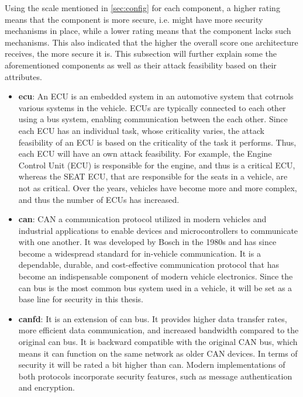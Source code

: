 Using the scale mentioned in \ref{sec:config} for each component, a higher rating means that the component is more secure, i.e. might have more security mechanisms in place,
while a lower rating means that the component lacks such mechanisms.
This also indicated that the higher the overall score one architecture receives, the more secure it is.
This subsection will further explain some the aforementioned components as well as their attack feasibility based on their attributes.

\begin{itemize}
    \item \textbf{\gls{ecu}}: An ECU is an embedded system in an automotive system that cotrnols various systems in the vehicle.
    ECUs are typically connected to each other using a bus system, enabling communication between the each other.
    Since each ECU has an individual task, whose criticality varies, the attack feasibility of an ECU is based on the criticality of the task it performs.
    Thus, each ECU will have an own attack feasibility. 
    For example, the Engine Control Unit (ECU) is responsible for the engine, and thus is a critical ECU, 
    whereas the SEAT ECU, that are responsible for the seats in a vehicle, are not as critical.
    Over the years, vehicles have become more and more complex, and thus the number of ECUs has increased.
    
    \item \textbf{\gls{can}}: CAN a communication protocol utilized in modern vehicles and industrial applications 
    to enable devices and microcontrollers to communicate with one another. 
    It was developed by Bosch in the 1980s and has since become a widespread standard for in-vehicle communication.
    It is a dependable, durable, and cost-effective communication protocol that has become an indispensable component of modern vehicle electronics.
    Since the \gls{can} bus is the most common bus system used in a vehicle, it will be set as a base line for security in this thesis.

    \item \textbf{\gls{canfd}}: It is an extension of \gls{can} bus.
    It provides higher data transfer rates, more efficient data communication, and increased bandwidth compared to the original \gls{can} bus.
    It is backward compatible with the original CAN bus, which means it can function on the same network as older CAN devices.
    In terms of security it will be rated a bit higher than \gls{can}.
    Modern implementations of both protocols incorporate security features, such as message authentication and encryption.
    

\end{itemize}
